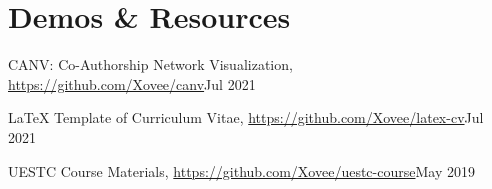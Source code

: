 \section*{Demos \& Resources}
\indent 

CANV: Co-Authorship Network Visualization, \url{https://github.com/Xovee/canv}\hfill Jul 2021

LaTeX Template of Curriculum Vitae, \url{https://github.com/Xovee/latex-cv}\hfill Jul 2021

UESTC Course Materials, \url{https://github.com/Xovee/uestc-course}\hfill May 2019 
